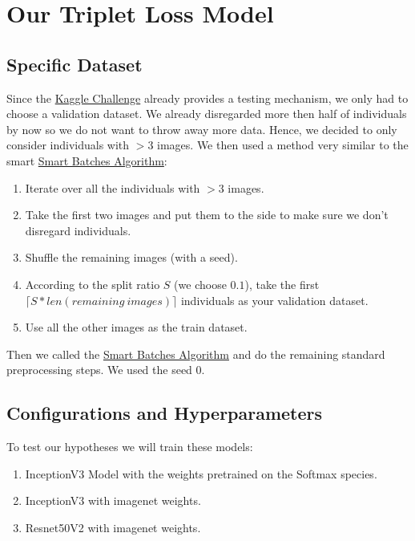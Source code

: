 \section{Our Triplet Loss Model}
\label{sec:triplet_loss_model}

\subsection{Specific Dataset}
Since the \hyperref[sec:kagglechallenge]{Kaggle Challenge} already provides a testing mechanism, we only had to choose a validation dataset. We already disregarded more then half of individuals by now so we do not want to throw away more data. Hence, we decided to only consider individuals with $>3$ images. We then used a method very similar to the smart \hyperref[subsubsec:smart-batches]{Smart Batches Algorithm}:

\begin{enumerate}
    \item Iterate over all the individuals with $>3$ images.
    \item Take the first two images and put them to the side to make sure we don't disregard individuals.
    \item Shuffle the remaining images (with a seed).
    \item According to the split ratio $S$ (we choose $0.1$), take the first $\lceil S * len(remaining\  images) \rceil$ individuals as your validation dataset.
    \item Use all the other images as the train dataset.
\end{enumerate}

\noindent Then we called the \hyperref[subsubsec:smart-batches]{Smart Batches Algorithm} and do the remaining standard preprocessing steps. We used the seed $0$.

\subsection{Configurations and Hyperparameters}
To test our hypotheses we  will train these models:
\begin{enumerate}
    \item InceptionV3 Model with the weights pretrained on the Softmax species.
    \item InceptionV3 with imagenet weights.
    \item Resnet50V2 with imagenet weights.
\end{enumerate}

